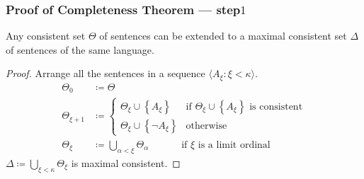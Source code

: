 \documentclass[UTF8,11pt,colorlinks,compress,openany]{beamer}%
\begin{document}
\begin{frame}\frametitle{Proof of Completeness Theorem --- step$1$}
	\begin{lemma}
		Any consistent set $\Theta$ of sentences can be extended to a maximal consistent set $\Delta$ of sentences of the same language.
	\end{lemma}
	\begin{proof}
		Arrange all the sentences in a sequence $\langle A_\xi: \xi<\kappa\rangle$.
		\begin{align*}
		\Theta_0&\coloneqq \Theta\\
		\Theta_{\xi+1}&\coloneqq 
		\begin{cases}
		\Theta_\xi\cup\left\{A_\xi\right\}&\text{if $\Theta_\xi\cup\left\{A_\xi\right\}$ is consistent}\\
		\Theta_\xi\cup\left\{\neg A_\xi\right\}&\text{otherwise}
		\end{cases}\\
		\Theta_\xi&\coloneqq \bigcup\limits_{\alpha<\xi}\Theta_\alpha\;\quad\qquad\text{if $\xi$ is a limit ordinal}
		\end{align*}
		$\Delta\coloneqq \bigcup\limits_{\xi<\kappa}\Theta_\xi$ is maximal consistent.
	\end{proof}
\end{frame}
\end{document}
